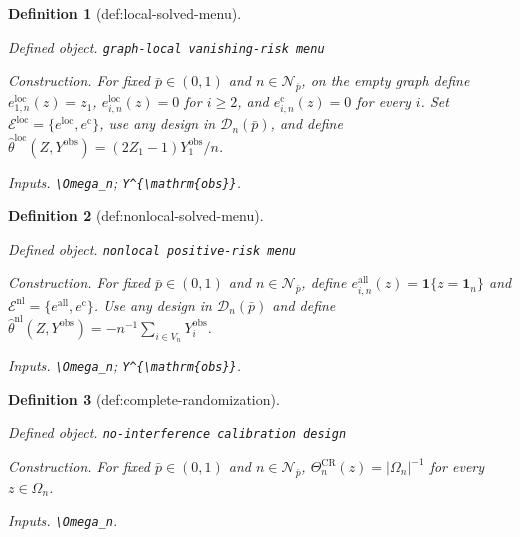 \documentclass{article}
\newtheorem{definition}{Definition}
\begin{document}
\begin{definition}[def:local-solved-menu]\label{def:local-solved-menu}
\par\smallskip\noindent\emph{Defined object.} \texttt{graph-\allowbreak{}local vanishing-\allowbreak{}risk menu}
\par\smallskip\noindent\emph{Construction.} For fixed \(\bar p\in(0,1)\) and \(n\in\mathcal N_{\bar p}\), on the empty graph define \(e^{\mathrm{loc}}_{1,n}(z)=z_1\), \(e^{\mathrm{loc}}_{i,n}(z)=0\) for \(i\ge2\), and \(e^{\mathrm c}_{i,n}(z)=0\) for every \(i\). Set \(\mathcal E^{\mathrm{loc}}=\{e^{\mathrm{loc}},e^{\mathrm c}\}\), use any design in \(\mathcal D_n(\bar p)\), and define \(\widehat\theta^{\mathrm{loc}}(Z,Y^{\mathrm{obs}})=(2Z_1-1)Y_1^{\mathrm{obs}}/n\).
\par\smallskip\noindent\emph{Inputs.} \texttt{\textbackslash{}\allowbreak{}Omega\_\allowbreak{}n}; \texttt{Y\textasciicircum{}\{\textbackslash{}\allowbreak{}mathrm\{obs\}\allowbreak{}\}\allowbreak{}}.
\end{definition}

\begin{definition}[def:nonlocal-solved-menu]\label{def:nonlocal-solved-menu}
\par\smallskip\noindent\emph{Defined object.} \texttt{nonlocal positive-\allowbreak{}risk menu}
\par\smallskip\noindent\emph{Construction.} For fixed \(\bar p\in(0,1)\) and \(n\in\mathcal N_{\bar p}\), define \(e^{\mathrm{all}}_{i,n}(z)=\mathbf 1\{z=\mathbf 1_n\}\) and \(\mathcal E^{\mathrm{nl}}=\{e^{\mathrm{all}},e^{\mathrm c}\}\). Use any design in \(\mathcal D_n(\bar p)\) and define \(\widehat\theta^{\mathrm{nl}}(Z,Y^{\mathrm{obs}})=-n^{-1}\sum_{i\in V_n}Y_i^{\mathrm{obs}}\).
\par\smallskip\noindent\emph{Inputs.} \texttt{\textbackslash{}\allowbreak{}Omega\_\allowbreak{}n}; \texttt{Y\textasciicircum{}\{\textbackslash{}\allowbreak{}mathrm\{obs\}\allowbreak{}\}\allowbreak{}}.
\end{definition}

\begin{definition}[def:complete-randomization]\label{def:complete-randomization}
\par\smallskip\noindent\emph{Defined object.} \texttt{no-\allowbreak{}interference calibration design}
\par\smallskip\noindent\emph{Construction.} For fixed \(\bar p\in(0,1)\) and \(n\in\mathcal N_{\bar p}\), \(\Theta_n^{\mathrm{CR}}(z)=|\Omega_n|^{-1}\) for every \(z\in\Omega_n\).
\par\smallskip\noindent\emph{Inputs.} \texttt{\textbackslash{}\allowbreak{}Omega\_\allowbreak{}n}.
\end{definition}
\end{document}
